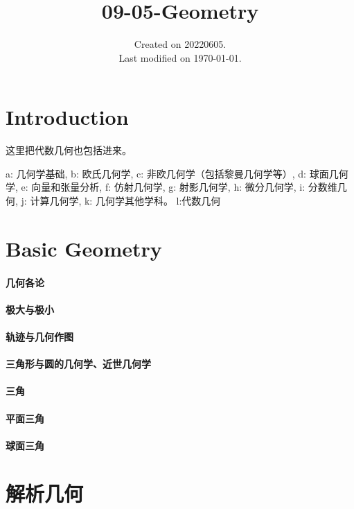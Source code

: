 \documentclass[UTF8]{../09-Mathematics}
\begin{document}
\title{09-05-Geometry}
\date{Created on 20220605.\\   Last modified on \today.}
\maketitle
\tableofcontents


\chapter{Introduction}
这里把代数几何也包括进来。

a: 几何学基础, 
b: 欧氏几何学, 
c: 非欧几何学（包括黎曼几何学等）, 
d: 球面几何学, 
e: 向量和张量分析, 
f: 仿射几何学, 
g: 射影几何学, 
h: 微分几何学, 
i: 分数维几何, 
j: 计算几何学, 
k: 几何学其他学科。
l:代数几何

\chapter{Basic Geometry}

\subsubsection{几何各论}
\subsubsection{极大与极小}
\subsubsection{轨迹与几何作图}
\subsubsection{三角形与圆的几何学、近世几何学}
\subsubsection{三角}
\subsubsection{平面三角}
\subsubsection{球面三角}



\chapter{解析几何}
\end{document}
